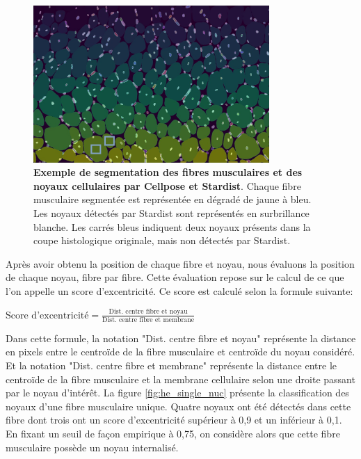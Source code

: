 \begin{figure}[htbp]
 \centering
 \includegraphics[width=0.8\textwidth]{figures/he_seg.png}
 \caption[Exemple de segmentation de biopsie par Cellpose et Stardist]{\textbf{Exemple de segmentation des fibres musculaires et des noyaux cellulaires par Cellpose et Stardist}. Chaque fibre musculaire segmentée est représentée en dégradé de jaune à bleu. Les noyaux détectés par Stardist sont représentés en surbrillance blanche. Les carrés bleus indiquent deux noyaux présents dans la coupe histologique originale, mais non détectés par Stardist.}
 \label{fig:he_seg}
\end{figure}

Après avoir obtenu la position de chaque fibre et noyau, nous évaluons la position de chaque noyau, fibre par fibre. Cette évaluation repose sur le calcul de ce que l'on appelle un score d'excentricité. Ce score est calculé selon la formule suivante:

\(\text{Score d'excentricité} = \frac{\text{Dist. centre fibre et noyau}}{\text{Dist. centre fibre et membrane}}\)

Dans cette formule, la notation "Dist. centre fibre et noyau" représente la distance en pixels entre le centroïde de la fibre musculaire et centroïde du noyau considéré. Et la notation "Dist. centre fibre et membrane" représente la distance entre le centroïde de la fibre musculaire et la membrane cellulaire selon une droite passant par le noyau d'intérêt. La figure \ref{fig:he_single_nuc} présente la classification des noyaux d'une fibre musculaire unique. Quatre noyaux ont été détectés dans cette fibre dont trois ont un score d'excentricité supérieur à 0,9 et un inférieur à 0,1. En fixant un seuil de façon empirique à 0,75, on considère alors que cette fibre musculaire possède un noyau internalisé.

